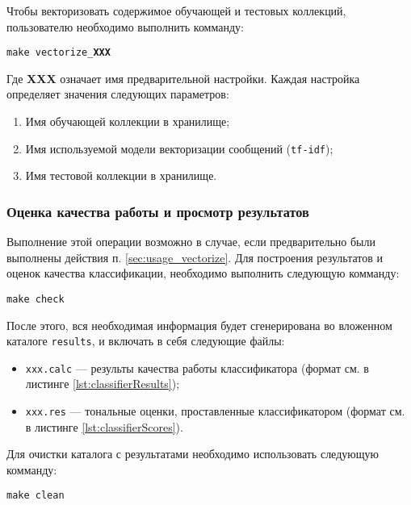         Чтобы векторизовать содержимое обучающей и тестовых коллекций, пользователю
        необходимо выполнить комманду:
        \begin{center}
            {\tt make vectorize\_{\bf XXX}}
        \end{center}

        Где {\bf XXX} означает имя предварительной настройки. Каждая настройка
        определяет значения следующих параметров:
        \begin{enumerate}
            \item Имя обучающей коллекции в хранилище;
            \item Имя используемой модели векторизации сообщений ({\tt tf-idf});
            \item Имя тестовой коллекции в хранилище.
        \end{enumerate}

        \subsubsection{Оценка качества работы и просмотр результатов}
        Выполнение этой операции возможно в случае, если предварительно были
        выполнены действия п. \ref{sec:usage_vectorize}.
        Для построения результатов и оценок качества классификации, необходимо
        выполнить следующую комманду:
        \begin{center}
            {\tt make check}
        \end{center}

        После этого, вся необходимая информация будет сгенерирована во вложенном
        каталоге {\tt results}, и включать в себя следующие файлы:
        \begin{itemize}
            \item {\tt xxx.calc} --- результы качества работы классификатора
            (формат см. в листинге \ref{lst:classifierResults});
            \item {\tt xxx.res} --- тональные оценки, проставленные
            классификатором (формат см. в листинге \ref{lst:classifierScores}).
        \end{itemize}

        Для очистки каталога с результатами необходимо использовать следующую
        комманду:
        \begin{center}
            {\tt make clean}
        \end{center}

